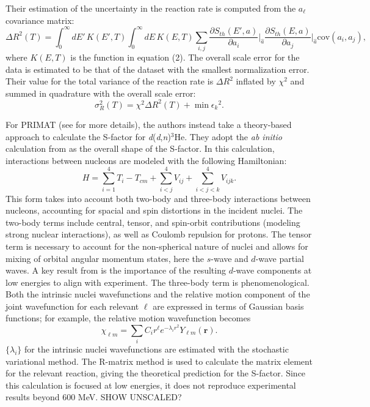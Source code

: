 \documentclass[%
 reprint,
superscriptaddress,
nofootinbib,
 amsmath,amssymb,
 aps,
 pra,
]{revtex4-2}
\begin{document}
Their estimation of the uncertainty in the reaction rate is computed from the $a_\ell$ covariance matrix: 
\begin{equation}
	\Delta R^2(T) = \int_0^\infty dE' \, K(E', T) \int_0^\infty dE \, K(E,T) \sum_{i,j} \frac{\partial S_{th} (E', a)}{\partial a_i}\biggr\rvert_{\hat{a}} \frac{\partial S_{th} (E, a)}{\partial a_j}\biggr\rvert_{\hat{a}} \text{cov}(a_i,a_j), \nonumber
\end{equation}
where $K(E,T)$ is the function in equation (2). The overall scale error for the data is estimated to be that of the dataset with the smallest normalization error. Their value for the total variance of the reaction rate is $\Delta R^2$ inflated by $\chi^2$ and summed in quadrature with the overall scale error: 
\begin{equation}
	\sigma_R^2(T) = \chi^2 \Delta R^2(T) + \min{\epsilon_k}^2. \nonumber
\end{equation}

For PRIMAT (see \cite{Inesta2017} for more details), the authors instead take a theory-based approach to calculate the S-factor for \textit{d}(\textit{d},\textit{n})$^3$He. They adopt the \textit{ab initio} calculation from \cite{Arai2011} as the overall shape of the S-factor. In this calculation, interactions between nucleons are modeled with the following Hamiltonian:
\begin{equation}
	H = \sum_{i=1}^4 T_i - T_{cm} + \sum_{i<j}^4 V_{ij} + \sum_{i<j<k}^4 V_{ijk}. \nonumber
\end{equation}
This form takes into account both two-body and three-body interactions between nucleons, accounting for spacial and spin distortions in the incident nuclei. The two-body terms include central, tensor, and spin-orbit contributions (modeling strong nuclear interactions), as well as Coulomb repulsion for protons. The tensor term is necessary to account for the non-spherical nature of nuclei and allows for mixing of orbital angular momentum states, here the $s$-wave and $d$-wave partial waves. A key result from \cite{Arai2011} is the importance of the resulting $d$-wave components at low energies to align with experiment. The three-body term is phenomenological. Both the intrinsic nuclei wavefunctions and the relative motion component of the joint wavefunction for each relevant $\ell$ are expressed in terms of Gaussian basis functions; for example, the relative motion wavefunction becomes
\begin{equation}
	\chi_{\ell m} = \sum_i C_i r^\ell e^{-\lambda_i r^2} Y_{\ell m}(\hat{\mathbf{r}}). \nonumber
\end{equation}
$\{\lambda_i\}$ for the intrinsic nuclei wavefunctions are estimated with the stochastic variational method. The R-matrix method is used to calculate the matrix element for the relevant reaction, giving the theoretical prediction for the S-factor. Since this calculation is focused at low energies, it does not reproduce experimental results beyond 600 MeV. SHOW UNSCALED?
\end{document}
